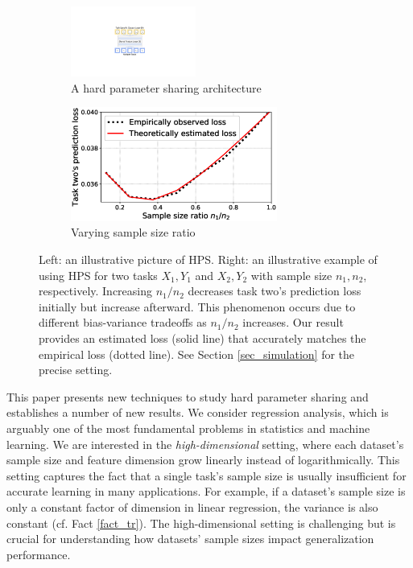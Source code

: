 \begin{figure}[!t]
	\begin{subfigure}[t]{0.5\textwidth}
		\centering
		\includegraphics[width=0.45\textwidth,valign=t]{figures/mtl_model_arch.pdf}
		\caption{A hard parameter sharing architecture}
		\label{fig_intro_arch}
	\end{subfigure}\hfill
	\begin{subfigure}[t]{0.5\textwidth}
		\centering
		\includegraphics[width=0.745\textwidth,valign=t]{figures/sample_ratio_c2_400.eps}
		\caption{Varying sample size ratio}
		\label{fig_intro_sample_size_b}
	\end{subfigure}
	\vspace{-0.1in}
	\caption{
	Left: an illustrative picture of HPS.
	Right: an illustrative example of using HPS for two tasks $X_1, Y_1$ and $X_2, Y_2$ with sample size $n_1, n_2$, respectively.
	Increasing $n_1/n_2$ decreases task two's prediction loss initially but increase afterward. This phenomenon occurs due to different bias-variance tradeoffs as $n_1/n_2$ increases. Our result provides an estimated loss (solid line) that accurately matches the empirical loss (dotted line).
	See Section \ref{sec_simulation} for the precise setting.}
	\label{fig_intro_sample_size}
	\vspace{-0.07in}
\end{figure}



This paper presents new techniques to study hard parameter sharing and establishes a number of new results.
We consider regression analysis, which is arguably one of the most fundamental problems in statistics and machine learning.
We are interested in the \textit{high-dimensional} setting, where each dataset's sample size and feature dimension grow linearly instead of logarithmically.
This setting captures the fact that a single task's sample size is usually insufficient for accurate learning in many applications.
For example, if a dataset's sample size is only a constant factor of dimension in linear regression, the variance is also constant (cf. Fact \ref{fact_tr}).
The high-dimensional setting is challenging but is crucial for understanding how datasets' sample sizes impact generalization performance.
